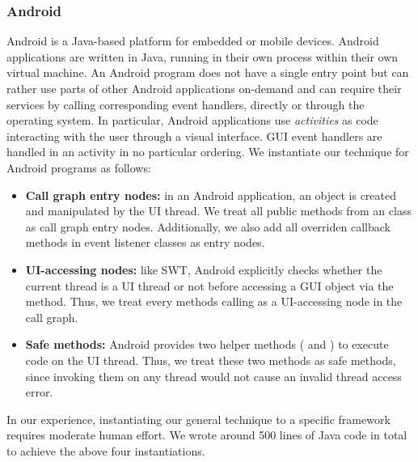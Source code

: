 \subsubsection{Android}

Android is a Java-based platform for embedded or mobile devices. 
Android applications are written in Java, running in their own process within their own virtual machine.
An Android program does not have a single entry point but can
rather use parts of other Android applications on-demand and can require their
services by calling corresponding event handlers, directly or through the
operating system. In particular, Android applications use \textit{activities}
as code interacting with the user through a visual interface. GUI event handlers
are handled in an activity  in no particular ordering.
We instantiate our technique for Android programs as follows:



\begin{itemize}

\item \textbf{Call graph entry nodes: } in an Android application,
an  object is created and manipulated by the UI thread. We treat
all public methods from an  class as call graph entry nodes. Additionally,
we also add all overriden callback methods in event listener classes as entry nodes.

\item \textbf{UI-accessing nodes: } like SWT, Android explicitly checks whether
the current thread is a UI thread or not before accessing a GUI object via
the  method.
Thus, we treat every methods calling  as a UI-accessing node
in the call graph.

\item \textbf{Safe methods: } Android provides two helper methods (
and ) to execute code on the UI thread. Thus, we treat
these two methods as safe methods, since invoking them on any thread
would not cause an invalid thread access error.

\end{itemize}


In our experience, instantiating our general technique to  a specific framework
requires moderate human effort. We wrote around 500 lines of Java code in total to achieve
the above four instantiations.
